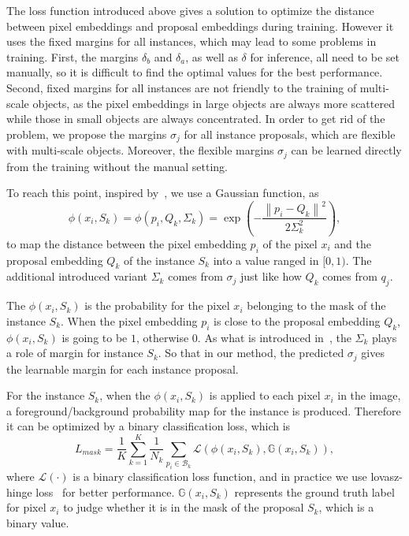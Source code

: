 \documentclass[10pt,twocolumn,letterpaper]{article}
\begin{document}
The loss function introduced above gives a solution to optimize the distance between pixel embeddings and proposal embeddings during training. 
However it uses the fixed margins for all instances, which may lead to some problems in training. 
First, the margins $\delta_b$ and $\delta_a$, as well as $\delta$ for inference, all need to be set manually, so it is difficult to find the optimal values for the best performance. 
Second, fixed margins for all instances are not friendly to the training of multi-scale objects, as the pixel embeddings in large objects are always more scattered while those in small objects are always concentrated.
In order to get rid of the problem, we propose the margins $\sigma_j$ for all instance proposals, which are flexible with multi-scale objects. 
Moreover, the flexible margins $\sigma_j$ can be learned directly from the training without the manual setting. 

To reach this point, inspired by~\cite{neven2019instance}, we use a Gaussian function, as
\begin{equation}
   \phi{\left(x_i, S_k\right)} = 
   \phi{\left(p_i, Q_k, \Sigma_k\right)} = 
   \exp{\left(-\frac{
      \left\|p_i-Q_k\right\|^2
   }{
      2\Sigma^2_k
   }\right)},
   \label{eq:probability}
\end{equation}
to map the distance between the pixel embedding $p_i$ of the pixel $x_i$ and the proposal embedding $Q_k$ of the instance $S_k$ into a value ranged in $[0, 1)$. 
The additional introduced variant $\Sigma_k$ comes from $\sigma_j$ just like how $Q_k$ comes from $q_j$. 


The $\phi{\left(x_i, S_k\right)}$ is the probability for the pixel $x_i$ belonging to the mask of the instance $S_k$. When the pixel embedding $p_i$ is close to the proposal embedding $Q_k$, $\phi{\left(x_i, S_k\right)}$ is going to be $1$, otherwise $0$.
As what is introduced in~\cite{neven2019instance}, the $\Sigma_k$ plays a role of margin for instance $S_k$. 
So that in our method, the predicted $\sigma_j$ gives the learnable margin for each instance proposal. 

For the instance $S_k$, when the $\phi{\left(x_i, S_k\right)}$ is applied to each pixel $x_i$ in the image, a foreground/background probability map for the instance is produced. Therefore it can be optimized by a binary classification loss, which is 
\begin{equation}
   L_{mask} = 
   \frac{1}{K}\sum_{k=1}^{K}
   {
      \frac{1}{N_k}\sum_{p_i\in{\mathcal{B}_k}}
      {
         \mathcal{L}\left({
            \phi{\left(x_i, S_k\right)}, 
            \mathbb{G}(x_i, S_k)
         }\right),
      }
   }
   \label{eq:mask_loss}
\end{equation}
where $\mathcal{L}(\cdot)$ is a binary classification loss function, and in practice we use lovasz-hinge loss~\cite{yu2015learning} for better performance. 
$\mathbb{G}(x_i, S_k)$ represents the ground truth label for pixel $x_i$ to judge whether it is in the mask of the proposal $S_k$, which is a binary value. 
\end{document}
